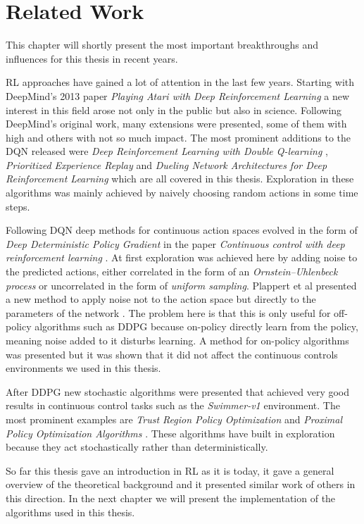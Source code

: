 \chapter{Related Work}
\label{section:related_work}

This chapter will shortly present the most important breakthroughs and influences for this thesis in recent years.


RL approaches have gained a lot of attention in the last few years.
Starting with DeepMind's 2013 paper \emph{Playing Atari with Deep Reinforcement Learning} \cite{atari} a new interest in this field arose not only in the public but also in science.
Following DeepMind's original work, many extensions were presented, some of them with high and others with not so much impact.
The most prominent additions to the DQN released were \emph{Deep Reinforcement Learning with Double Q-learning} \cite{ddqn}, \emph{Prioritized Experience Replay} \cite{per} and \emph{Dueling Network Architectures for Deep Reinforcement Learning} \cite{duel_dqn} which are all covered in this thesis.
Exploration in these algorithms was mainly achieved by naively choosing random actions in some time steps.


Following DQN deep methods for continuous action spaces evolved in the form of \emph{Deep Deterministic Policy Gradient} in the paper \emph{Continuous control with deep reinforcement learning} \cite{ddpg}.
At first exploration was achieved here by adding noise to the predicted actions, either correlated in the form of an \emph{Ornstein–Uhlenbeck process} or uncorrelated in the form of \emph{uniform sampling}.
Plappert et al presented a new method to apply noise not to the action space but directly to the parameters of the network \cite{param_noise}.
The problem here is that this is only useful for off-policy algorithms such as DDPG because on-policy directly learn from the policy, meaning noise added to it disturbs learning.
A method for on-policy algorithms was presented but it was shown that it did not affect the continuous controls environments we used in this thesis.


After DDPG new stochastic algorithms were presented that achieved very good results in continuous control tasks such as the \emph{Swimmer-v1} environment.
The most prominent examples are \emph{Trust Region Policy Optimization} \cite{trpo} and \emph{Proximal Policy Optimization Algorithms} \cite{ppo}.
These algorithms have built in exploration because they act stochastically rather than deterministically.


So far this thesis gave an introduction in RL as it is today, it gave a general overview of the theoretical background and it presented similar work of others in this direction.
In the next chapter we will present the implementation of the algorithms used in this thesis.
